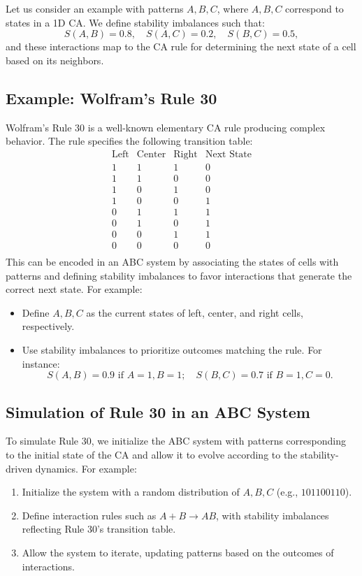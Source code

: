 \documentclass[entropy,article,submit,pdftex,moreauthors]{Definitions/mdpi}
\begin{document}
Let us consider an example with patterns \( A, B, C \), where \( A, B, C \) correspond to states in a 1D CA. We define stability imbalances such that:
\[
S(A, B) = 0.8, \quad S(A, C) = 0.2, \quad S(B, C) = 0.5,
\]
and these interactions map to the CA rule for determining the next state of a cell based on its neighbors.

\subsection{Example: Wolfram’s Rule 30}

Wolfram’s Rule 30 is a well-known elementary CA rule producing complex behavior. The rule specifies the following transition table:
\[
\begin{array}{ccc|c}
\text{Left} & \text{Center} & \text{Right} & \text{Next State} \\
1 & 1 & 1 & 0 \\
1 & 1 & 0 & 0 \\
1 & 0 & 1 & 0 \\
1 & 0 & 0 & 1 \\
0 & 1 & 1 & 1 \\
0 & 1 & 0 & 1 \\
0 & 0 & 1 & 1 \\
0 & 0 & 0 & 0 \\
\end{array}
\]
This can be encoded in an ABC system by associating the states of cells with patterns and defining stability imbalances to favor interactions that generate the correct next state. For example:
\begin{itemize}
    \item Define \( A, B, C \) as the current states of left, center, and right cells, respectively.
    \item Use stability imbalances to prioritize outcomes matching the rule. For instance:
    \[
    S(A, B) = 0.9 \text{ if } A = 1, B = 1; \quad S(B, C) = 0.7 \text{ if } B = 1, C = 0.
    \]
\end{itemize}

\subsection{Simulation of Rule 30 in an ABC System}

To simulate Rule 30, we initialize the ABC system with patterns corresponding to the initial state of the CA and allow it to evolve according to the stability-driven dynamics. For example:
\begin{enumerate}
    \item Initialize the system with a random distribution of \( A, B, C \) (e.g., \( 101100110 \)).
    \item Define interaction rules such as \( A + B \to AB \), with stability imbalances reflecting Rule 30’s transition table.
    \item Allow the system to iterate, updating patterns based on the outcomes of interactions.
\end{enumerate}
\end{document}
